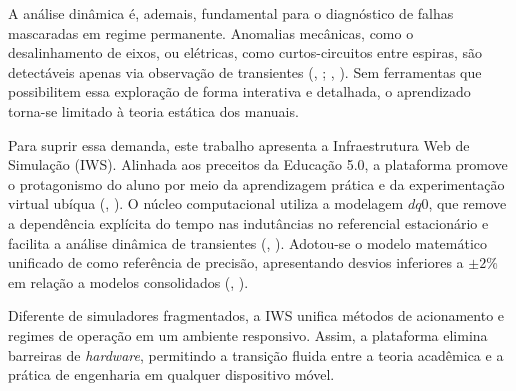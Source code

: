 \documentclass[a4paper]{ifacconf}
\begin{document}
\begin{table}[htbp]
\centering
\caption{Comparação funcional entre a IWS proposta e ferramentas convencionais de simulação.}
\label{tab:comparacao_ferramentas}
\end{table}

A análise dinâmica é, ademais, fundamental para o diagnóstico de falhas mascaradas em regime permanente. Anomalias mecânicas, como o desalinhamento de eixos, ou elétricas, como curtos-circuitos entre espiras, são detectáveis apenas via observação de transientes (\citeauthor{tuanmohamad2024advance}, \citeyear{tuanmohamad2024advance}; \citeauthor{arkan2005modelling}, \citeyear{arkan2005modelling}). Sem ferramentas que possibilitem essa exploração de forma interativa e detalhada, o aprendizado torna-se limitado à teoria estática dos manuais.

Para suprir essa demanda, este trabalho apresenta a Infraestrutura Web de Simulação (IWS). Alinhada aos preceitos da Educação 5.0, a plataforma promove o protagonismo do aluno por meio da aprendizagem prática e da experimentação virtual ubíqua (\citeauthor{cordeiro2024educacao}, \citeyear{cordeiro2024educacao}). O núcleo computacional utiliza a modelagem $dq0$, que remove a dependência explícita do tempo nas indutâncias no referencial estacionário e facilita a análise dinâmica de transientes (\citeauthor{sengamalai2022three}, \citeyear{sengamalai2022three}). Adotou-se o modelo matemático unificado de \cite{usta2024mathematical} como referência de precisão, apresentando desvios inferiores a $\pm2\%$ em relação a modelos consolidados (\citeauthor{leroux2022static}, \citeyear{leroux2022static}).

Diferente de simuladores fragmentados, a IWS unifica métodos de acionamento e regimes de operação em um ambiente responsivo. Assim, a plataforma elimina barreiras de \textit{hardware}, permitindo a transição fluida entre a teoria acadêmica e a prática de engenharia em qualquer dispositivo móvel.
\end{document}
